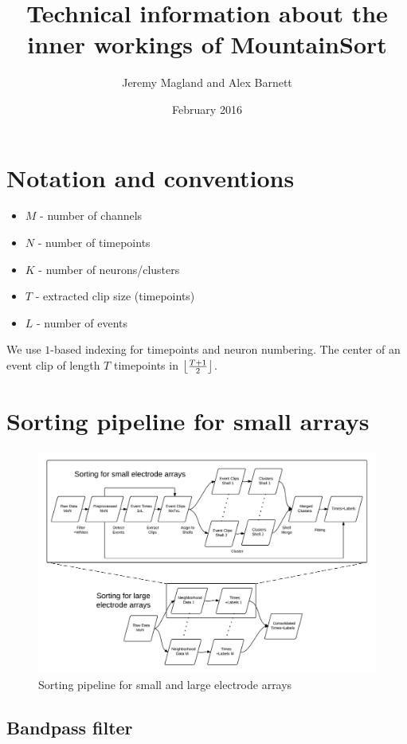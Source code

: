 \documentclass{article}
\title{Technical information about the inner workings of MountainSort}
\author{Jeremy Magland and Alex Barnett}
\date{February 2016}
\DeclarePairedDelimiter\floor{\lfloor}{\rfloor}
\begin{document}
\maketitle

\section{Notation and conventions}

\begin{itemize}
    \item[] $M$ - number of channels
    \item[] $N$ - number of timepoints
    \item[] $K$ - number of neurons/clusters
    \item[] $T$ - extracted clip size (timepoints)
    \item[] $L$ - number of events
\end{itemize}

We use $1$-based indexing for timepoints and neuron numbering. The center of an event clip of length $T$ timepoints in $\floor*{\frac{T+1}{2}}$.

\section{Sorting pipeline for small arrays}

\begin{figure}[h]
\caption{Sorting pipeline for small and large electrode arrays}
\includegraphics[width=4.5in]{pipelines.png}
\end{figure}

\subsection{Bandpass filter}
\end{document}
